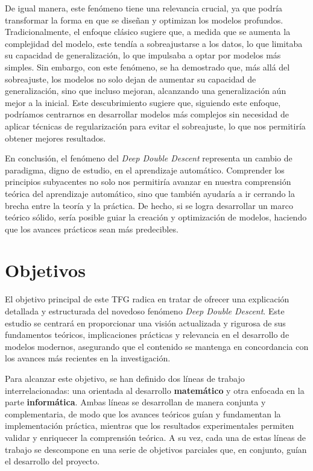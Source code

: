 De igual manera, este fenómeno tiene una relevancia crucial, ya que podría transformar la forma en que se diseñan y optimizan los modelos profundos. Tradicionalmente, el enfoque clásico sugiere que, a medida que se aumenta la complejidad del modelo, este tendía a sobreajustarse a los datos, lo que limitaba su capacidad de generalización, lo que impulsaba a optar por modelos más simples. Sin embargo, con este fenómeno, se ha demostrado que, más allá del sobreajuste, los modelos no solo dejan de aumentar su capacidad de generalización, sino que incluso mejoran, alcanzando una generalización aún mejor a la inicial. Este descubrimiento sugiere que, siguiendo este enfoque, podríamos centrarnos en desarrollar modelos más complejos sin necesidad de aplicar técnicas de regularización para evitar el sobreajuste, lo que nos permitiría obtener mejores resultados.\newline

En conclusión, el fenómeno del \emph{Deep Double Descent} representa un cambio de paradigma, digno de estudio, en el aprendizaje automático. Comprender los principios subyacentes no solo nos permitiría avanzar en nuestra comprensión teórica del aprendizaje automático, sino que también ayudaría a ir cerrando la brecha entre la teoría y la práctica. De hecho, si se logra desarrollar un marco teórico sólido, sería posible guiar la creación y optimización de modelos, haciendo que los avances prácticos sean más predecibles.\newline

\section{Objetivos}

El objetivo principal de este TFG radica en tratar de ofrecer una explicación detallada y estructurada del novedoso fenómeno \emph{Deep Double Descent}. Este estudio se centrará en proporcionar una visión actualizada y rigurosa de sus fundamentos teóricos, implicaciones prácticas y relevancia en el desarrollo de modelos modernos, asegurando que el contenido se mantenga en concordancia con los avances más recientes en la investigación.\newline

Para alcanzar este objetivo, se han definido dos líneas de trabajo interrelacionadas: una orientada al desarrollo \textbf{matemático} y otra enfocada en la parte \textbf{informática}. Ambas líneas se desarrollan de manera conjunta y complementaria, de modo que los avances teóricos guían y fundamentan la implementación práctica, mientras que los resultados experimentales permiten validar y enriquecer la comprensión teórica. A su vez, cada una de estas líneas de trabajo se descompone en una serie de objetivos parciales que, en conjunto, guían el desarrollo del proyecto.\newline

